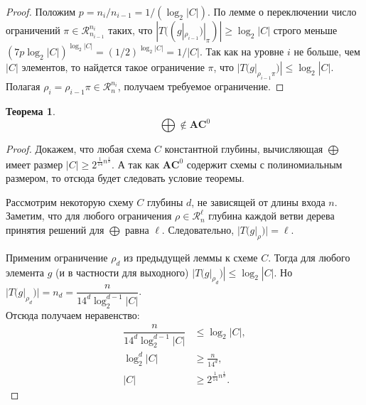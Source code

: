 \documentclass[12pt]{article}
\theoremstyle{plain}
\newtheorem{theorem}{Теорема}
\theoremstyle{remark}
\theoremstyle{definition}
\begin{document}
\begin{proof}
Положим $p = n_{i}/n_{i - 1} = 1/(\log_2|C|)$. По лемме о переключении число ограничений  $\pi \in \mathcal{R}_{n_{i - 1}}^{n_{i}}$ таких, что  $|T((g|_{\rho_{i - 1}})|_\pi)| \ge \log_2|C|$ строго меньше $(7 p \log_2|C|)^{\log_2|C|} = (1/2)^{\log_2|C|} = 1/|C|$. Так как на уровне $i$ не больше, чем $|C|$ элементов, то найдется такое ограничение $\pi$, что $|T(g|_{\rho_{i - 1}\pi})| \le \log_2|C|$. Полагая $\rho_i = \rho_{i - 1}\pi \in \mathcal{R}_n^{n_i}$, получаем требуемое ограничение.


\end{proof}

\begin{theorem}
\[ \bigoplus \notin \mathbf{AC}^0 \]
\end{theorem}

\begin{proof}
Докажем, что любая схема $C$ константной глубины, вычисляющая $\bigoplus$ имеет размер $|C| \ge 2^{\frac{1}{14}n^{\frac{1}{d}}}$. А так как $\mathbf{AC}^0$ содержит схемы с полиномиальным размером, то отсюда будет следовать условие теоремы.

Рассмотрим некоторую схему $C$ глубины $d$, не зависящей от длины входа $n$. Заметим, что для любого ограничения $\rho \in \mathcal{R}_n^{\ell}$ глубина каждой ветви дерева принятия решений для $\bigoplus$ равна $\ell$.  Следовательно, $|T(g|_{\rho})| = \ell$.


Применим ограничение $\rho_d$ из предыдущей леммы к схеме $C$. Тогда для любого элемента $g$ (и в частности для выходного) $|T(g|_{\rho_d})| \le \log_2|C|$. Но $|T(g|_{\rho_d})|  = n_d = \dfrac{n}{14^d\log_2^{d - 1}|C|}$. \\ Отсюда получаем неравенство:
\begin{align*}
\dfrac{n}{14^d\log_2^{d - 1}|C|} &\le \log_2|C|, \\
\log_2^{d}|C| &\ge \frac{n}{14^d}, \\
|C| &\ge 2^{\frac{1}{14}n^{\frac{1}{d}}}.
\end{align*}
\end{proof}
\nocite{*}

\newpage



\end{document}
